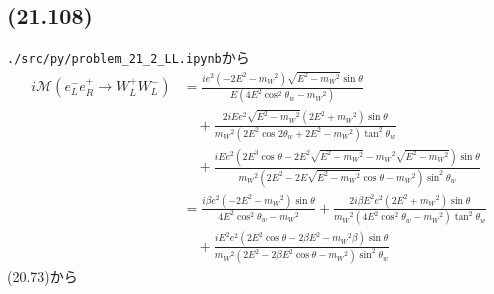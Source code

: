 \subsection{(21.108)}
\verb|./src/py/problem_21_2_LL.ipynb|から
\begin{align*}
  i\mathcal{M}(e^-_Le^+_R \to W^+_LW^-_L) &= \frac{i e^2 \left(- 2 E^2 - m_W{}^2\right) \sqrt{E^2 - m_W{}^2} \sin\theta}{E \left(4 E^2 \cos^2\theta_w - m_W{}^2\right)} \\
  &\quad+ \frac{2 i E e^2 \sqrt{E^2 - m_W{}^2} \left(2 E^2 + m_W{}^2\right) \sin\theta}{m_W{}^2 \left(2 E^2 \cos2\theta_w + 2 E^2 - m_W{}^2\right) \tan^2\theta_w} \\
  &\quad+ \frac{i E e^2 \left(2 E^3 \cos\theta - 2 E^2 \sqrt{E^2 - m_W{}^2} - m_W{}^2 \sqrt{E^2 - m_W{}^2}\right) \sin\theta}{m_W{}^2 \left(2 E^2 - 2 E \sqrt{E^2 - m_W{}^2} \cos\theta - m_W{}^2\right) \sin^2\theta_w} \\
  &= \frac{i \beta e^2 \left(- 2 E^2 - m_W{}^2\right) \sin\theta}{4 E^2 \cos^2\theta_w - m_W{}^2}
  + \frac{2 i \beta E^2 e^2 \left(2 E^2 + m_W{}^2\right) \sin\theta}{m_W{}^2 \left(4 E^2 \cos^2\theta_w - m_W{}^2\right) \tan^2\theta_w} \\
  &\quad+ \frac{i E^2 e^2 \left(2 E^2 \cos\theta - 2 \beta E^2  - m_W{}^2 \beta \right) \sin\theta}{m_W{}^2 \left(2 E^2 - 2 \beta E^2 \cos\theta - m_W{}^2\right) \sin^2\theta_w}
\end{align*}
(20.73)から
